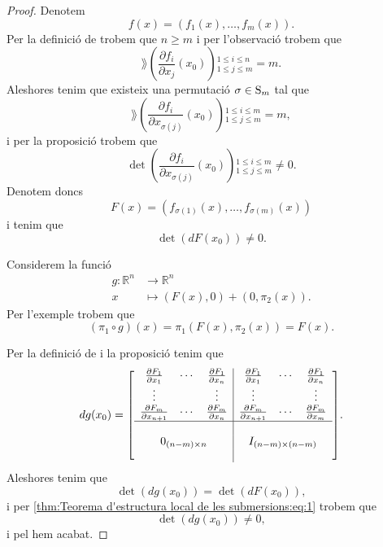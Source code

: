 \documentclass[../Apunts.tex]{subfiles}
\begin{document}
	\begin{proof}
		Denotem
		\[f(x)=(f_{1}(x),\dots,f_{m}(x)).\]
		Per la definició de  trobem que \(n\geq m\) i per l'observació  trobem que
		\[\rang\left(\frac{\partial f_{i}}{\partial x_{j}}(x_{0})\right){}_{1\leq j\leq m}^{1\leq i\leq n}=m.\]
		Aleshores tenim que existeix una permutació \(\sigma\in\operatorname{S}_{m}\) tal que
		\[\rang\left(\frac{\partial f_{i}}{\partial x_{\sigma(j)}}(x_{0})\right){}_{1\leq j\leq m}^{1\leq i\leq m}=m,\]
		i per la proposició  trobem que
		\[\det\left(\frac{\partial f_{i}}{\partial x_{\sigma(j)}}(x_{0})\right){}_{1\leq j\leq m}^{1\leq i\leq m}\neq0.\]
		Denotem doncs
		\[F(x)=(f_{\sigma(1)}(x),\dots,f_{\sigma(m)}(x))\]
		i tenim que
		\begin{equation}
			\label{thm:Teorema d'estructura local de les submersions:eq:1}
			\det(dF(x_{0}))\neq0.
		\end{equation}
		
		Considerem la funció
		\begin{align*}
			g\colon\mathbb{R}^{n}&\longrightarrow\mathbb{R}^{n} \\
			x&\longmapsto(F(x),0)+(0,\pi_{2}(x)).
		\end{align*}
		Per l'exemple  trobem que
		\[(\pi_{1}\circ g)(x)=\pi_{1}(F(x),\pi_{2}(x))=F(x).\]
		
		Per la definició de  i la proposició  tenim que
		\[dg(x_{0})=\left[\begin{array}{c|c}
			\begin{matrix}
				\frac{\partial F_{1}}{\partial x_{1}} & \cdots & \frac{\partial F_{1}}{\partial x_{n}} \\
				\vdots & & \vdots \\
				\frac{\partial F_{m}}{\partial x_{n+1}} & \cdots & \frac{\partial F_{m}}{\partial x_{n}}
			\end{matrix} & \begin{matrix}
				\frac{\partial F_{1}}{\partial x_{1}} & \cdots & \frac{\partial F_{1}}{\partial x_{n}} \\
				\vdots & & \vdots \\
				\frac{\partial F_{m}}{\partial x_{n+1}} & \cdots & \frac{\partial F_{m}}{\partial x_{m}}
			\end{matrix} \\ \hline \\
			0_{(n-m)\times n} & I_{(n-m)\times(n-m)} \\
			&
		\end{array}\right].\]
		Aleshores tenim que
		\[\det(dg(x_{0}))=\det(dF(x_{0})),\]
		i per \eqref{thm:Teorema d'estructura local de les submersions:eq:1} trobem que
		\[\det(dg(x_{0}))\neq0,\]
		i pel  hem acabat.
	\end{proof}
\end{document}
